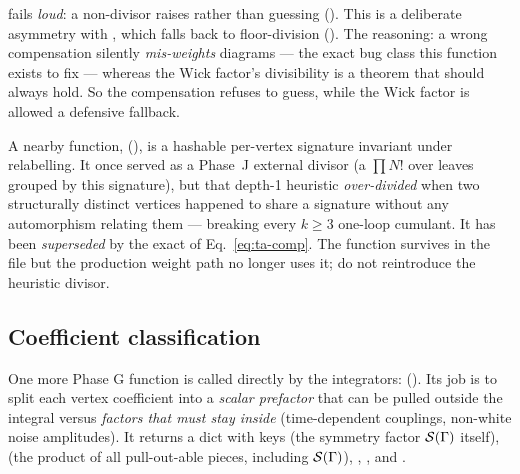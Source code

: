 \begin{gotcha}
 fails \emph{loud}: a non-divisor raises
 rather than guessing (). This is a
deliberate asymmetry with , which falls back to
floor-division (). The reasoning: a wrong compensation
silently \emph{mis-weights} diagrams --- the exact bug class this function exists
to fix --- whereas the Wick factor's divisibility is a theorem that should always
hold. So the compensation refuses to guess, while the Wick factor is allowed a
defensive fallback.
\end{gotcha}

\begin{gotcha}
A nearby function,  (),
is a hashable per-vertex signature invariant under relabelling. It once served as
a Phase~J external divisor (a $\prod N!$ over leaves grouped by this signature),
but that depth-1 heuristic \emph{over-divided} when two structurally distinct
vertices happened to share a signature without any automorphism relating them ---
breaking every $k\ge3$ one-loop cumulant. It has been \emph{superseded} by the
exact  of Eq.~\eqref{eq:ta-comp}. The function
survives in the file but the production weight path no longer uses it; do not
reintroduce the heuristic divisor.
\end{gotcha}

\subsection{Coefficient classification}\label{sec:ta-coeff}

One more Phase G function is called directly by the integrators:
 (). Its job is to
split each vertex coefficient into a \emph{scalar prefactor} that can be pulled
outside the integral versus \emph{factors that must stay inside} (time-dependent
couplings, non-white noise amplitudes). It returns a dict with keys 
(the symmetry factor $\mathcal{S}(\Gamma)$ itself),  (the
product of all pull-out-able pieces, including $\mathcal{S}(\Gamma)$),
, , and
.


